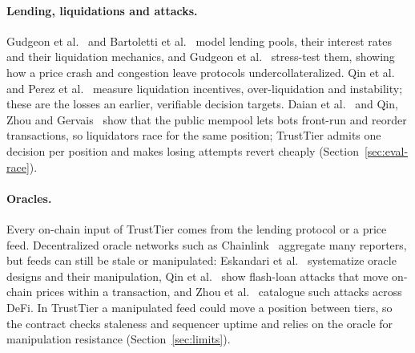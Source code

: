 \documentclass[sigconf,nonacm]{acmart}
\begin{document}
\paragraph{Lending, liquidations and attacks.} Gudgeon et al.~\cite{gudgeon2020loanable} and Bartoletti et al.~\cite{bartoletti2021lending} model lending pools, their interest rates and their liquidation mechanics, and Gudgeon et al.~\cite{gudgeon2020crisis} stress-test them, showing how a price crash and congestion leave protocols undercollateralized. Qin et al.~\cite{qin2021liquidations} and Perez et al.~\cite{perez2021knife} measure liquidation incentives, over-liquidation and instability; these are the losses an earlier, verifiable decision targets. Daian et al.~\cite{daian2020flashboys} and Qin, Zhou and Gervais~\cite{qin2022bev} show that the public mempool lets bots front-run and reorder transactions, so liquidators race for the same position; TrustTier admits one decision per position and makes losing attempts revert cheaply (Section~\ref{sec:eval-race}).

\paragraph{Oracles.} Every on-chain input of TrustTier comes from the lending protocol or a price feed. Decentralized oracle networks such as Chainlink~\cite{breidenbach2021chainlink} aggregate many reporters, but feeds can still be stale or manipulated: Eskandari et al.~\cite{eskandari2021oracles} systematize oracle designs and their manipulation, Qin et al.~\cite{qin2021flashloans} show flash-loan attacks that move on-chain prices within a transaction, and Zhou et al.~\cite{zhou2023sok} catalogue such attacks across DeFi. In TrustTier a manipulated feed could move a position between tiers, so the contract checks staleness and sequencer uptime and relies on the oracle for manipulation resistance (Section~\ref{sec:limits}).
\end{document}
